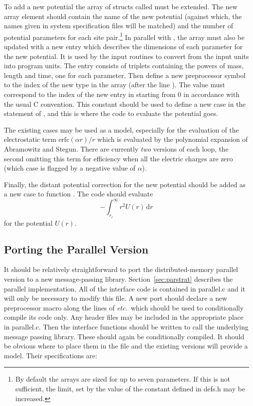 \documentclass[a4paper,twoside]{report}
\newcommand{\Fname}[1]{{\upshape\mdseries\sffamily#1}}
\newcommand{\Calcd}{\mathrm{d}}
\newcommand{\etc}{\emph{etc.}}
\newcommand{\erfc}{\mbox{erfc}}
\begin{document}
To add a new potential the array of structs called 
must be extended.  The new array element should contain the name of
the new potential (against which, the names given in system
specification files will be matched) and the number of potential
parameters for each site pair.\footnote{By default the arrays are sized
  for up to seven parameters. If this is not sufficient, the limit,
  set by the value of the constant  defined in
  \Fname{defs.h} may be increased.}  In parallel with
, the array  must also be updated
with a new entry which describes the dimensions of each parameter for
the new potential. It is used by the input routines to convert from
the input units into program units.  The entry consists of triplets
containing the powers of mass, length and time, one for each
parameter.  Then define a new preprocessor symbol to the index of the
new type in the array  (after the line
).  The value must correspond to the index
of the new entry in  starting from 0 in accordance
with the usual C convention.  This constant should be used to define a
new case in the  statement of , and
this is where the code to evaluate the potential goes.

The existing cases may be used as a model, especially for the
evaluation of the electrostatic term $\erfc(\alpha r) / r$ which is
evaluated by the polynomial expansion of Abramowitz and
Stegun\cite[section 7.1.26]{abramowitz:70}. There are currently
\emph{two} versions of each loop, the second omitting this term for
efficiency when all the electric charges are zero (which case is
flagged by a negative value of $\alpha$).

Finally, the distant potential correction for the new potential should
be added as a new case to function . The code
should evaluate
\[
- \int^{\infty}_{r_c} r^2 U(r) \, \Calcd r
\]
for the potential $U(r)$.

\subsection{Porting the Parallel Version}
\label{sec:parport}
It should be relatively straightforward to port the distributed-memory
parallel version to a new message-passing library.
Section~\ref{sec:parstrat} describes the parallel implementation. All
of the interface code is contained in \Fname{parallel.c} and it will
only be necessary to modify this file.  A new port should declare a
new preprocessor macro along the lines of  \etc\ which
should be used to conditionally compile its code only.  Any header
files may be included in the appropriate place in \Fname{parallel.c}.
Then the interface functions should be written to call the underlying
message passing library. These should again be conditionally compiled.
It should be obvious where to place them in the file and the existing
versions will provide a model.  Their specifications are:
\end{document}
